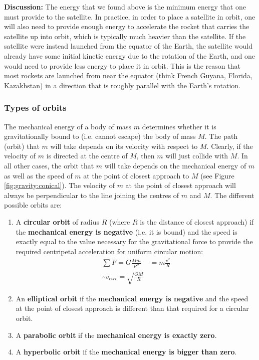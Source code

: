 \begin{example}
\textbf{Discussion:} The energy that we found above is the minimum energy that one must provide to the satellite. In practice, in order to place a satellite in orbit, one will also need to provide enough energy to accelerate the rocket that carries the satellite up into orbit, which is typically much heavier than the satellite. If the satellite were instead launched from the equator of the Earth, the satellite would already have some initial kinetic energy due to the rotation of the Earth, and one would need to provide less energy to place it in orbit. This is the reason that most rockets are launched from near the equator (think French Guyana, Florida, Kazakhstan) in a direction that is roughly parallel with the Earth's rotation.
\end{example}

\subsubsection{Types of orbits}
The mechanical energy of a body of mass $m$ determines whether it is gravitationally bound to (i.e. cannot escape) the body of mass $M$. The path (orbit) that $m$ will take depends on its velocity with respect to $M$. Clearly, if the velocity of $m$ is directed at the centre of $M$, then $m$ will just collide with $M$. In all other cases, the orbit that $m$ will take depends on the mechanical energy of $m$ as well as the speed of $m$ at the point of closest approach to $M$ (see Figure \ref{fig:gravity:conical}). The velocity of $m$ at the point of closest approach will always be perpendicular to the line joining the centres of $m$ and $M$. The different possible orbits are:
\begin{enumerate}
\item A \textbf{circular orbit} of radius $R$ (where $R$ is the distance of closest approach) if the \textbf{mechanical energy is negative} (i.e. it is bound) and the speed is exactly equal to the value necessary for the gravitational force to provide the required centripetal acceleration for uniform circular motion:
\begin{align*}
\sum F = G\frac{Mm}{R^2} &= m\frac{v^2}{R}\\
\therefore v_{circ}=\sqrt{\frac{GM}{R}}
\end{align*}
\item An \textbf{elliptical orbit} if the \textbf{mechanical energy is negative} and the speed at the point of closest approach is different than that required for a circular orbit.
\item A \textbf{parabolic orbit} if the \textbf{mechanical energy is exactly zero}.
\item A \textbf{hyperbolic orbit} if the \textbf{mechanical energy is bigger than zero}.
\end{enumerate}
